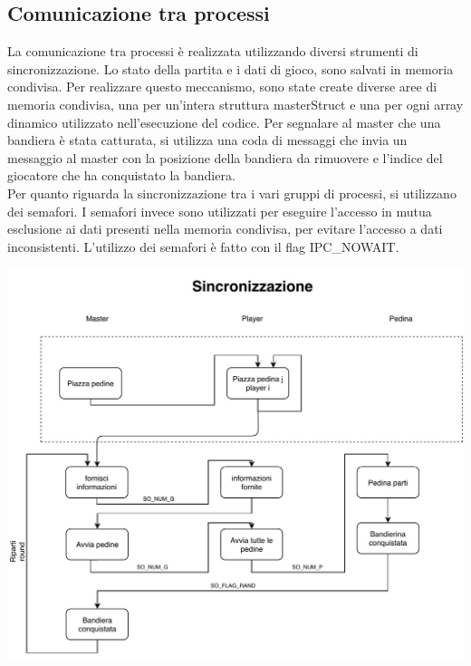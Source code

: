 \documentclass{article}
\begin{document}
\subsection{Comunicazione tra processi}
La comunicazione tra processi è realizzata utilizzando diversi strumenti di sincronizzazione. \newline
Lo stato della partita e i dati di gioco, sono salvati in memoria condivisa. Per realizzare questo meccanismo, sono state create diverse aree di memoria condivisa, una per un'intera struttura masterStruct e una per ogni array dinamico utilizzato nell'esecuzione del codice. \newline
Per segnalare al master che una bandiera è stata catturata, si utilizza una coda di messaggi che invia un messaggio al master con la posizione della bandiera da rimuovere e l'indice del giocatore che ha conquistato la bandiera.\\
Per quanto riguarda la sincronizzazione tra i vari gruppi di processi, si utilizzano dei semafori.\newline
I semafori invece sono utilizzati per eseguire l'accesso in mutua esclusione ai dati presenti nella memoria condivisa, per evitare l'accesso a dati inconsistenti. L'utilizzo dei semafori è fatto con il flag IPC\_NOWAIT.\newline
\begin{center}
\includegraphics[width=.8\textwidth]{Sync.pdf}
\end{center}
\end{document}
